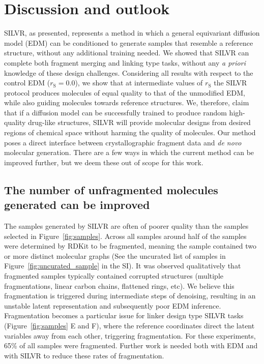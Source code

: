 \documentclass[journal=jacsat,manuscript=article]{achemso}
\begin{document}
\section{Discussion and outlook}
\label{sec:discussion}
SILVR, as presented, represents a method in which a general equivariant diffusion model (EDM) can be conditioned to generate samples that resemble a reference structure, without any additional training needed. We showed that SILVR can complete both fragment merging and linking type tasks, without any \textit{a priori} knowledge of these design challenges. Considering all results with respect to the control EDM ($r_{\mathrm{S}}=0.0$), we show that at intermediate values of $r_{\mathrm{S}}$ the SILVR protocol produces molecules of equal quality to that of the unmodified EDM, while also guiding molecules towards reference structures. We, therefore, claim that if a diffusion model can be successfully trained to produce random high-quality drug-like structures, SILVR will provide molecular designs from desired regions of chemical space without harming the quality of molecules. Our method poses a direct interface between crystallographic fragment data and \textit{de novo} molecular generation. There are a few ways in which the current method can be improved further, but we deem these out of scope for this work. 

\subsection{The number of unfragmented molecules generated can be improved}
The samples generated by SILVR are often of poorer quality than the samples selected in Figure~\ref{fig:samples}. Across all samples around half of the samples were determined by RDKit to be fragmented, meaning the sample contained two or more distinct molecular graphs (See the uncurated list of samples in Figure~\ref{fig:uncurated_sample} in the SI). It was observed qualitatively that fragmented samples typically contained corrupted structures (multiple fragmentations, linear carbon chains, flattened rings, etc). We believe this fragmentation is triggered during intermediate steps of denoising, resulting in an unstable latent representation and subsequently poor EDM inference. Fragmentation becomes a particular issue for linker design type SILVR tasks (Figure~\ref{fig:samples} E and F), where the reference coordinates direct the latent variables away from each other, triggering fragmentation. For these experiments, 65\% of all samples were fragmented. Further work is needed both with EDM and with SILVR to reduce these rates of fragmentation. 
\end{document}

